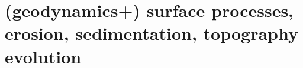 






































\section{(geodynamics+) surface processes, erosion, sedimentation, topography evolution}

